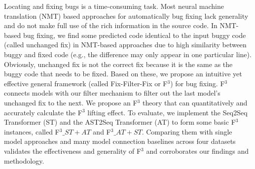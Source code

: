 Locating and fixing bugs is a time-consuming task. Most neural machine translation  (NMT) based approaches for automatically bug fixing lack generality and do not make full use of the rich information in the source code. In NMT-based bug fixing, we find some predicted code identical to the input buggy code  (called unchanged fix) in NMT-based approaches due to high similarity between buggy and fixed code  (e.g., the difference may only appear in one particular line). Obviously, unchanged fix is not the correct fix because it is the same as the buggy code that needs to be fixed. Based on these, we propose an intuitive yet effective general framework (called Fix-Filter-Fix or F$^3$) for bug fixing. F$^3$ connects models with our filter mechanism to filter out the last model's unchanged fix to the next. We propose an F$^3$ theory that can quantitatively and accurately calculate the F$^3$ lifting effect. To evaluate, we implement the  Seq2Seq Transformer  (ST) and the AST2Seq Transformer  (AT) to form some basic F$^3$ instances, called F$^3\_{ST+AT}$ and F$^3\_{AT+ST}$. Comparing them with single model approaches and many model connection baselines across four datasets validates the effectiveness and generality of F$^3$ and corroborates our findings and methodology.
